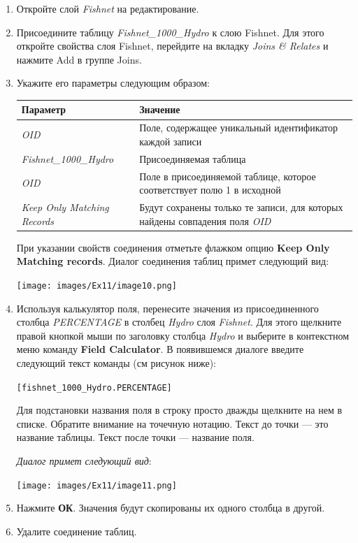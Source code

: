 \documentclass[12pt,]{book}
\begin{document}
\begin{enumerate}
\def\labelenumi{\arabic{enumi}.}
\item
  Откройте слой \emph{Fishnet} на редактирование.
\item
  Присоедините таблицу \emph{Fishnet\_1000\_Hydro} к слою Fishnet. Для этого откройте свойства слоя Fishnet, перейдите на вкладку \emph{Joins \& Relates} и нажмите Add в группе Joins.
\item
  Укажите его параметры следующим образом:

  \begin{longtable}[]{@{}ll@{}}
  \toprule
  Параметр & Значение\tabularnewline
  \midrule
  \endhead
  \emph{OID} & Поле, содержащее уникальный идентификатор каждой записи\tabularnewline
  \emph{Fishnet\_1000\_Hydro} & Присоединяемая таблица\tabularnewline
  \emph{OID} & Поле в присоединяемой таблице, которое соответствует полю 1 в исходной\tabularnewline
  \emph{Keep Only Matching Records} & Будут сохранены только те записи, для которых найдены совпадения поля \emph{OID}\tabularnewline
  \bottomrule
  \end{longtable}

  При указании свойств соединения отметьте флажком опцию \textbf{Keep Only Matching records}. Диалог соединения таблиц примет следующий вид:

  \texttt{[image: images/Ex11/image10.png]}
\item
  Используя калькулятор поля, перенесите значения из присоединенного столбца \emph{PERCENTAGE} в столбец \emph{Hydro} слоя \emph{Fishnet}. Для этого щелкните правой кнопкой мыши по заголовку столбца \emph{Hydro} и выберите в контекстном меню команду \textbf{Field Calculator}. В появившемся диалоге введите следующий текст команды (см рисунок ниже):

  \texttt{{[}fishnet\_1000\_Hydro.PERCENTAGE{]}}

  Для подстановки названия поля в строку просто дважды щелкните на нем в списке. Обратите внимание на точечную нотацию. Текст до точки --- это название таблицы. Текст после точки --- название поля.

  \emph{Диалог примет следующий вид}:

  \texttt{[image: images/Ex11/image11.png]}
\item
  Нажмите \textbf{ОК}. Значения будут скопированы их одного столбца в другой.
\item
  Удалите соединение таблиц.
\end{enumerate}
\end{document}
